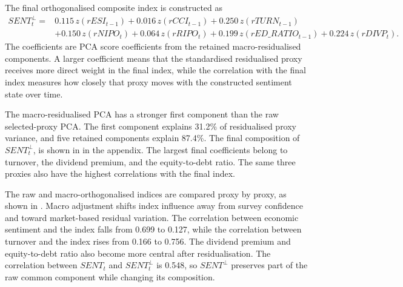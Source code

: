 \documentclass[11pt]{article}
\newcommand{\var}[1]{\ensuremath{#1}}
\begin{document}
The final orthogonalised composite index is constructed as
\begin{equation}
\begin{aligned}
    SENT^{\perp}_{t}
    ={}&
    0.115\,z(rESI_{t-1})
    + 0.016\,z(rCCI_{t-1})
    + 0.250\,z(rTURN_{t-1}) \\
    &+ 0.150\,z(rNIPO_t)
    + 0.064\,z(rRIPO_t)
    + 0.199\,z(rED\_RATIO_{t-1})
    + 0.224\,z(rDIVP_t).
\end{aligned}
\label{eq:sent_orth_composite}
\end{equation}
The coefficients are PCA score coefficients from the retained macro-residualised components. A larger coefficient means that the standardised residualised proxy receives more direct weight in the final index, while the correlation with the final index measures how closely that proxy moves with the constructed sentiment state over time.

The macro-residualised PCA has a stronger first component than the raw selected-proxy PCA. The first component explains 31.2\% of residualised proxy variance, and five retained components explain 87.4\%. The final composition of \var{SENT^{\perp}_t}, is shown in  in the appendix. The largest final coefficients belong to turnover, the dividend premium, and the equity-to-debt ratio. The same three proxies also have the highest correlations with the final index.

The raw and macro-orthogonalised indices are compared proxy by proxy, as shown in . Macro adjustment shifts index influence away from survey confidence and toward market-based residual variation. The correlation between economic sentiment and the index falls from 0.699 to 0.127, while the correlation between turnover and the index rises from 0.166 to 0.756. The dividend premium and equity-to-debt ratio also become more central after residualisation. The correlation between \var{SENT_t} and \var{SENT^{\perp}_t} is 0.548, so \var{SENT^{\perp}} preserves part of the raw common component while changing its composition.
\end{document}
